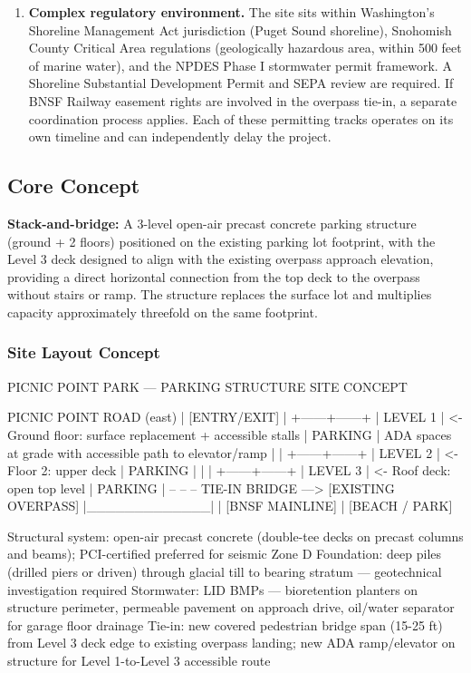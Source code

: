 \documentclass[11pt,letterpaper]{article}
\begin{document}
\begin{enumerate}
  \item \textbf{Complex regulatory environment.} The site sits within Washington's Shoreline Management Act jurisdiction (Puget Sound shoreline), Snohomish County Critical Area regulations (geologically hazardous area, within 500 feet of marine water), and the NPDES Phase I stormwater permit framework. A Shoreline Substantial Development Permit and SEPA review are required. If BNSF Railway easement rights are involved in the overpass tie-in, a separate coordination process applies. Each of these permitting tracks operates on its own timeline and can independently delay the project.
\end{enumerate}

\subsection{Core Concept}

\textbf{Stack-and-bridge:} A 3-level open-air precast concrete parking structure (ground + 2 floors) positioned on the existing parking lot footprint, with the Level 3 deck designed to align with the existing overpass approach elevation, providing a direct horizontal connection from the top deck to the overpass without stairs or ramp. The structure replaces the surface lot and multiplies capacity approximately threefold on the same footprint.

\subsubsection{Site Layout Concept}

\begin{asciibox}
PICNIC POINT PARK — PARKING STRUCTURE SITE CONCEPT

PICNIC POINT ROAD (east)
         |
    [ENTRY/EXIT]
         |
  +------+------+
  |   LEVEL 1   |  <- Ground floor: surface replacement + accessible stalls
  |  PARKING    |     ADA spaces at grade with accessible path to elevator/ramp
  |             |
  +------+------+
  |   LEVEL 2   |  <- Floor 2: upper deck
  |  PARKING    |
  |             |
  +------+------+
  |   LEVEL 3   |  <- Roof deck: open top level
  |  PARKING    |  -- -- -- TIE-IN BRIDGE ---> [EXISTING OVERPASS]
  |_____________|                                       |
                                                   [BNSF MAINLINE]
                                                        |
                                                    [BEACH / PARK]

Structural system: open-air precast concrete (double-tee decks on precast
  columns and beams); PCI-certified preferred for seismic Zone D
Foundation: deep piles (drilled piers or driven) through glacial till
  to bearing stratum — geotechnical investigation required
Stormwater: LID BMPs — bioretention planters on structure perimeter,
  permeable pavement on approach drive, oil/water separator for garage floor drainage
Tie-in: new covered pedestrian bridge span (15-25 ft) from Level 3
  deck edge to existing overpass landing; new ADA ramp/elevator on
  structure for Level 1-to-Level 3 accessible route
\end{asciibox}
\end{document}
